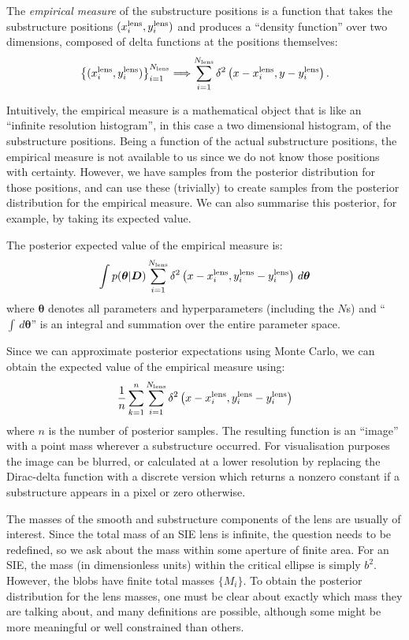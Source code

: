 \documentclass[useAMS,usenatbib]{mn2e}
\begin{document}
The {\it empirical measure} of the substructure positions is a function that
takes the substructure positions $(x_i^{\rm lens}, y_i^{\rm lens})$ and
produces a ``density function'' over two dimensions, composed of delta
functions at the positions themselves:
\begin{eqnarray}
\left\{
(x_i^{\rm lens}, y_i^{\rm lens})
\right\}_{i=1}^{N_{\rm lens}}
\Longrightarrow
\sum_{i=1}^{N_{\rm lens}}
\delta^2\left(x - x_i^{\rm lens}, y - y_i^{\rm lens}\right).
\end{eqnarray}

Intuitively, the empirical measure is a mathematical object that is like
an ``infinite resolution histogram'', in this case a two dimensional histogram,
of the substructure positions.
Being a function of the actual substructure positions, the empirical measure
is not available to us since we do not know those positions with certainty.
However, we have samples from the posterior distribution for those positions,
and can use these (trivially) to create samples from the posterior distribution
for the empirical measure. We can also summarise this posterior, for example,
by taking its expected value.

The posterior expected value of the empirical measure is:
\begin{eqnarray}
\int p(\boldsymbol{\theta} | \boldsymbol{D})
\sum_{i=1}^{N_{\rm lens}}
\delta^2\left(x - x_i^{\rm lens}, y_i^{\rm lens} - y_i^{\rm lens}\right)
\, d\boldsymbol{\theta}
\end{eqnarray}
where $\boldsymbol{\theta}$ denotes all parameters and hyperparameters
(including the $N$s) and ``$\int \,d\boldsymbol{\theta}$'' is an integral and summation over the entire parameter space.

Since we can approximate posterior expectations using Monte Carlo, we can
obtain the expected value of the empirical measure using:
\begin{eqnarray}
\frac{1}{n}
\sum_{k=1}^n
\sum_{i=1}^{N_{\rm lens}}
\delta^2\left(x - x_i^{\rm lens}, y_i^{\rm lens} - y_i^{\rm lens}\right)
\end{eqnarray}
where $n$ is the number of posterior samples. The resulting function is
an ``image'' with a point mass wherever a substructure occurred. For
visualisation purposes the image can be blurred, or calculated at a lower
resolution by replacing the Dirac-delta function with a discrete version
which returns a nonzero constant
if a substructure appears in a pixel or zero otherwise.

The masses of the smooth and substructure components of the lens are usually
of interest. Since the total mass of an SIE lens is infinite, the question
needs to be redefined, so we ask about the mass within some aperture of finite
area. For an SIE, the mass (in dimensionless units) within the critical
ellipse is simply $b^2$. However, the blobs have finite total masses
$\{M_i\}$. To obtain the posterior distribution for the lens masses, one must
be clear about exactly which mass they are talking about, and many definitions
are possible, although some might be more meaningful or well constrained than
others.
\end{document}
